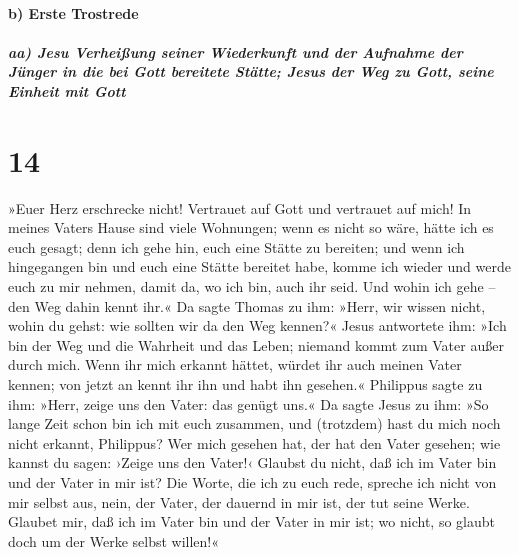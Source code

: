 \hypertarget{b-erste-trostrede}{%
\paragraph{b) Erste Trostrede}\label{b-erste-trostrede}}

\hypertarget{aa-jesu-verheiuxdfung-seiner-wiederkunft-und-der-aufnahme-der-juxfcnger-in-die-bei-gott-bereitete-stuxe4tte-jesus-der-weg-zu-gott-seine-einheit-mit-gott}{%
\subparagraph{aa) Jesu Verheißung seiner Wiederkunft und der Aufnahme
der Jünger in die bei Gott bereitete Stätte; Jesus der Weg zu Gott,
seine Einheit mit
Gott}\label{aa-jesu-verheiuxdfung-seiner-wiederkunft-und-der-aufnahme-der-juxfcnger-in-die-bei-gott-bereitete-stuxe4tte-jesus-der-weg-zu-gott-seine-einheit-mit-gott}}

\hypertarget{section-13}{%
\section{14}\label{section-13}}

 »Euer Herz erschrecke nicht! Vertrauet auf Gott und
vertrauet auf mich!  In meines Vaters Hause sind viele
Wohnungen; wenn es nicht so wäre, hätte ich es euch gesagt; denn ich
gehe hin, euch eine Stätte zu bereiten;  und wenn ich
hingegangen bin und euch eine Stätte bereitet habe, komme ich wieder und
werde euch zu mir nehmen, damit da, wo ich bin, auch ihr seid.
 Und wohin ich gehe -- den Weg dahin kennt ihr.«
 Da sagte Thomas zu ihm: »Herr, wir wissen nicht, wohin du
gehst: wie sollten wir da den Weg kennen?«  Jesus
antwortete ihm: »Ich bin der Weg und die Wahrheit und das Leben; niemand
kommt zum Vater außer durch mich.  Wenn ihr mich erkannt
hättet, würdet ihr auch meinen Vater kennen; von jetzt an kennt ihr ihn
und habt ihn gesehen.«  Philippus sagte zu ihm: »Herr,
zeige uns den Vater: das genügt uns.«  Da sagte Jesus zu
ihm: »So lange Zeit schon bin ich mit euch zusammen, und (trotzdem) hast
du mich noch nicht erkannt, Philippus? Wer mich gesehen hat, der hat den
Vater gesehen; wie kannst du sagen: ›Zeige uns den Vater!‹
 Glaubst du nicht, daß ich im Vater bin und der Vater in
mir ist? Die Worte, die ich zu euch rede, spreche ich nicht von mir
selbst aus, nein, der Vater, der dauernd in mir ist, der tut seine
Werke.  Glaubet mir, daß ich im Vater bin und der Vater
in mir ist; wo nicht, so glaubt doch um der Werke selbst willen!«

